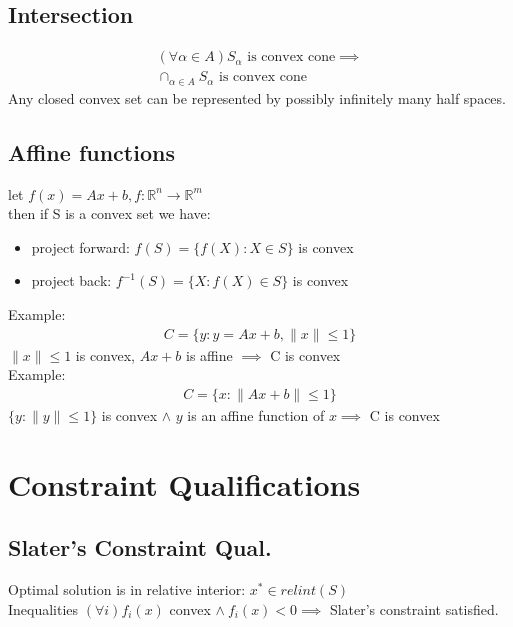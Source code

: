 \documentclass[8pt]{report}
\newcommand{\R}{\mathbb{R}}
\newcommand{\norm}[1]{\|#1\|}
\begin{document}
\begin{multicols*}{2}
  \subsection{Intersection}
  \begin{align*}
    (\forall \alpha \in A) S_{\alpha}\text{ is convex cone} \implies\\
    \cap_{\alpha \in A} S_{\alpha} \text{ is convex cone}
  \end{align*}
  Any closed convex set can be represented by possibly infinitely many half spaces.\\
  
  \subsection{Affine functions}
  let $f(x)=Ax+b, f:\R^n \to \R^m$\\
  then if S is a convex set we have:
  \begin{itemize}
  \item project forward: $f(S) = \{ f(X) : X \in S \}$ is convex
  \item project back: $f^{-1}(S) = \{ X : f(X) \in S \}$ is convex
  \end{itemize}
  Example:
  \begin{align*}
    C = \{ y : y=Ax+b, \norm{x} \leq 1\}
  \end{align*}
  $\norm{x} \leq 1$ is convex, $Ax+b$ is affine $\implies$ C is convex\\
  Example:
  \begin{align*}
    C = \{ x : \norm{Ax+b} \leq 1 \}
  \end{align*}
    $\{y: \norm{y} \leq 1 \}$ is convex $\wedge$ $y$ is an affine function of $x \implies$ C is convex\\

  \vfill\null
  \pagebreak

  \section{Constraint Qualifications}

  \subsection{Slater's Constraint Qual.}
  Optimal solution is in relative interior: $x^* \in relint(S)$\\
  
  Inequalities $(\forall i)f_i(x)$ convex $\wedge\ f_i(x)<0 \implies$ Slater's constraint satisfied.\\
  

\end{multicols*}
\end{document}
